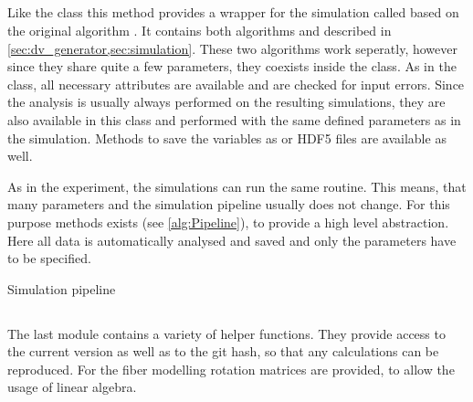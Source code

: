 \subsection{}
Like the  class this method provides a wrapper for the simulation called  based on the original algorithm \cite{Dohmen2015,Lucksch2016}.
It contains both algorithms  and  described in \cref{sec:dv_generator,sec:simulation}.
These two algorithms work seperatly, however since they share quite a few parameters, they coexists inside the class.
As in the  class, all necessary attributes are available and are checked for input errors.
Since the analysis is usually always performed on the resulting simulations, they are also available in this class and performed with the same defined parameters as in the simulation.
Methods to save the variables as  or \ac{HDF5} files are available as well.
\par
As in the experiment, the simulations can run the same routine.
This means, that many parameters and the simulation pipeline usually does not change.
For this purpose  methods exists (see \cref{alg:Pipeline}), to provide a high level abstraction.
Here all data is automatically analysed and saved and only the parameters have to be specified.
%
\begin{lstfloat}[!tb]
\centering
\scalebox{0.75}{
\begin{minipage}{\the\textwidth}

\end{minipage}}
\caption{Simulation pipeline}
\label{alg:Pipeline}
\end{lstfloat}
%
%
\subsection{}
The last module contains a variety of helper functions.
They provide access to the current version as well as to the git hash, so that any calculations can be reproduced.
For the fiber modelling rotation matrices are provided, to allow the usage of linear algebra.
%
%
%
